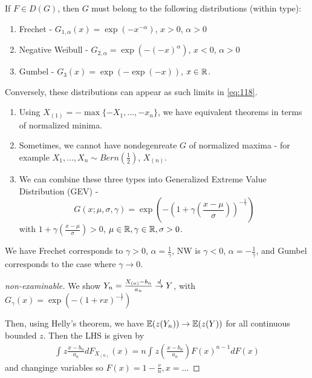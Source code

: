 \begin{thm}
  \label{defn:extreme_value_theory:3}
  If $F \in D(G)$, then $G$ must belong to the following distributions
  (within type):

  \begin{enumerate}
  \item Frechet - $G_{1, \alpha}(x) = \exp(-x^{-\alpha})$, $x > 0$,
    $\alpha > 0$
  \item Negative Weibull - $G_{2, \alpha} = \exp(- (-x)^{\alpha})$, $x
    < 0$, $\alpha > 0$
  \item Gumbel - $G_{3}(x) = \exp(-\exp(-x))$, $x \in \mathbb{R}$.
  \end{enumerate}

  Conversely, these distributions can appear as such limits in \eqref{eq:118}.
\end{thm}

\begin{remark}
  \begin{enumerate}
  \item Using $X_{(1)} = -\max \{ -X_{1}, \dots, -x_{n} \} $, we have
    equivalent theorems in terms of normalized minima.
  \item Sometimes, we cannot have nondegenreate $G$ of normalized
    maxima  - for example $X_{1}, \dots, X_{n} \sim
    Bern(\frac{1}{2})$, $X_{(n)}$.
  \item We can combine these three types into Generalized Extreme
    Value Distribution (GEV) -
    \begin{equation}
      \label{eq:122}
      G(x; \mu, \sigma, \gamma) = \exp(- (1 + \gamma(\frac{x-\mu}{\sigma}))^{-\frac{1}{\gamma}})
    \end{equation} with $1 + \gamma(\frac{x - \mu}{\sigma}) > 0$, $\mu
    \in \mathbb{R}, \gamma \in \mathbb{R}, \sigma > 0$.
  \end{enumerate}

  We have Frechet corresponds to $\gamma > 0$, $\alpha =
  \frac{1}{\gamma} $, NW is $\gamma < 0$, $\alpha =
  -\frac{1}{\gamma}$, and Gumbel corresponds to the case where $\gamma
  \rightarrow 0$.
\end{remark}

\begin{proof}[non-examinable]
  We show $Y_{n} = \frac{X_{(n)} - b_{n}}{a_{n}} \overset{d}{\rightarrow} Y$, with
  $G_{\gamma}(x) = \exp(- (1 + rx)^{-\frac{1}{r}})$

  Then, using Helly's theorem, we have $\E{z(Y_{n})} \rightarrow
  \E{z(Y)}$ for all continuous bounded $z$.  Then the LHS is given by 
  \begin{align}
    \label{eq:123}
    \int_{}^{} z \frac{x - b_{n}}{a_{n}} d F_{X_{(n)}}(x) = n
    \int_{}^{} z(\frac{x - b_{n}}{a_{n}}) F(x)^{n-1} dF(x)
  \end{align} and changinge variables so $F(x) = 1 - \frac{v}{n}, x = \dots$
\end{proof}

